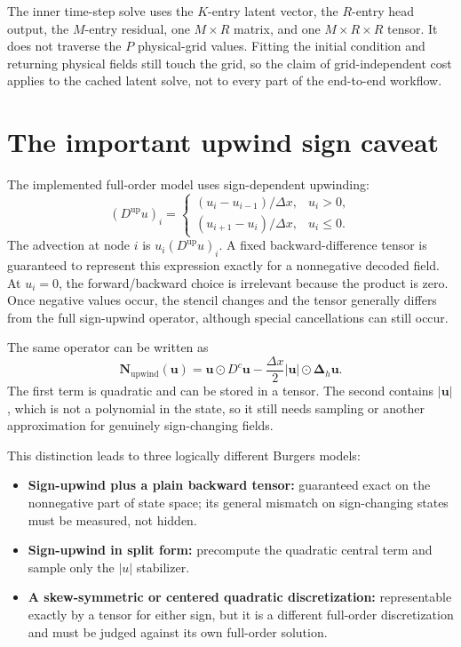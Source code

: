 \documentclass[11pt]{article}
\newcommand{\mat}[1]{\mathbf{#1}}
\newcommand{\vect}[1]{\mathbf{#1}}
\begin{document}
The inner time-step solve uses the $K$-entry latent vector, the $R$-entry head
output, the $M$-entry residual, one $M\times R$ matrix, and one
$M\times R\times R$ tensor.  It does not traverse the $P$ physical-grid values.
Fitting the initial condition and returning physical fields still touch the
grid, so the claim of grid-independent cost applies to the cached latent
solve, not to every part of the end-to-end workflow.

\section{The important upwind sign caveat}

The implemented full-order model uses sign-dependent upwinding:
\begin{equation}
  (D^{\mathrm{up}}u)_i=
  \begin{cases}
    (u_i-u_{i-1})/\Delta x, & u_i>0,\\
    (u_{i+1}-u_i)/\Delta x, & u_i\le 0.
  \end{cases}
\end{equation}
The advection at node $i$ is $u_i(D^{\mathrm{up}}u)_i$.  A fixed
backward-difference tensor is guaranteed to represent this expression exactly
for a nonnegative decoded field.  At $u_i=0$, the forward/backward choice is
irrelevant because the product is zero.  Once negative values occur, the
stencil changes and the tensor generally differs from the full sign-upwind
operator, although special cancellations can still occur.

The same operator can be written as
\begin{equation}
  \vect{N}_{\mathrm{upwind}}(\vect{u})
  =\vect{u}\odot D^c\vect{u}
   -\frac{\Delta x}{2}|\vect{u}|\odot\mat{\Delta}_h\vect{u}.
\end{equation}
The first term is quadratic and can be stored in a tensor.  The second contains
$|\vect{u}|$, which is not a polynomial in the state, so it still needs
sampling or another approximation for genuinely sign-changing fields.

This distinction leads to three logically different Burgers models:
\begin{itemize}
  \item \textbf{Sign-upwind plus a plain backward tensor:} guaranteed exact on
        the nonnegative part of state space; its general mismatch on
        sign-changing states must be measured, not hidden.
  \item \textbf{Sign-upwind in split form:} precompute the quadratic central
        term and sample only the $|u|$ stabilizer.
  \item \textbf{A skew-symmetric or centered quadratic discretization:}
        representable exactly by a tensor for either sign, but it is a
        different full-order discretization and must be judged against its own
        full-order solution.
\end{itemize}
\end{document}
